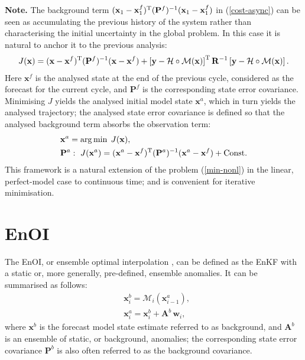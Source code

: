 \documentclass[11pt]{report}
\newcommand{\mb} {\mathbf}
\newcommand{\T}{^{\tiny \mathrm T}}
\begin{document}
{
  \setlength{\abovedisplayskip}{2pt}
  \setlength{\belowdisplayskip}{2pt}
  \scriptsize
  {\bf Note.} The background term $(\mb x_1 - \mb x_1^f)\T (\mb P^f)^{-1} (\mb x_1 - \mb x_1^f)$ in (\ref{cost-async}) can be seen as accumulating the previous history of the system rather than characterising the initial uncertainty in the global problem.
  In this case it is natural to anchor it to the previous analysis:
  \begin{align}
    J(\mb x) = (\mb x - \mb x^f)\T (\mb P^f)^{-1} (\mb x - \mb x^f) + \left [ \mb y - \mathcal H \circ \mathcal M(\mb x) \right ] \T \mb R^{-1} \left [ \mb y - \mathcal H \circ \mathcal M(\mb x) \right ].
  \end{align}
  Here $\mb x^f$ is the analysed state at the end of the previous cycle, considered as the forecast for the current cycle, and $\mb P^f$ is the corresponding state error covariance.
  Minimising $J$ yields the analysed initial model state $\mb x^a$, which in turn yields the analysed trajectory; the analysed state error covariance is defined so that the analysed background term absorbs the observation term:
  \begin{align*}
    &\mb x^a = \arg \min \; J(\mb x),\\
    &\mb P^a: \ J(\mb x^a) = (\mb x^a - \mb x^f)\T (\mb P^a)^{-1} (\mb x^a - \mb x^f) + \mathrm{Const}.
  \end{align*}
  This framework is a natural extension of the problem (\ref{min-nonl}) in the linear, perfect-model case to continuous time; and is convenient for iterative minimisation.\par
}

\section{EnOI}

The EnOI, or ensemble optimal interpolation \citep{eve03a}, can be defined as the EnKF with a static or, more generally, pre-defined, ensemble anomalies.
It can be summarised as follows:
\begin{align}
  \label{enoi-for}
  & \mb x^b_i = \mathcal M_i(\mb x^a_{i-1}),\\
  & \mb x^a_i = \mb x^b_i + \mb A^b \, \mb w_i,
\end{align}
where $\mb x^b$ is the forecast model state estimate referred to as background, and $\mb A^b$ is an ensemble of static, or background, anomalies; the corresponding state error covariance $\mb P^b$ is also often referred to as the background covariance.
\end{document}
